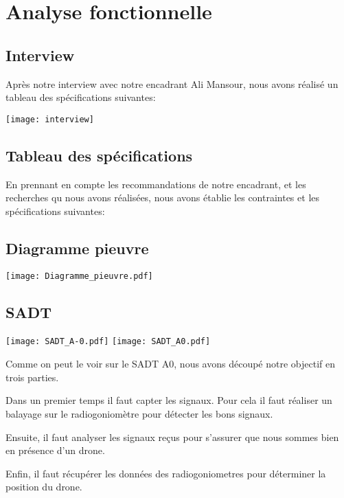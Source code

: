 \chapter{Analyse fonctionnelle}

\section{Interview}

Après notre interview avec notre encadrant Ali Mansour, nous avons réalisé un tableau des spécifications suivantes:

\texttt{[image: interview]}


\section{Tableau des spécifications}
En prennant en compte les recommandations de notre encadrant, et les recherches qu nous avons réalisées, nous avons établie les contraintes et les spécifications suivantes:





\section{Diagramme pieuvre}

\hspace{-2cm}
\texttt{[image: Diagramme\_pieuvre.pdf]}



\section{SADT}

\texttt{[image: SADT\_A-0.pdf]}
\texttt{[image: SADT\_A0.pdf]}

\parindent=15pt

Comme on peut le voir sur le SADT A0, nous avons découpé notre objectif en trois parties.

Dans un premier temps il faut capter les signaux. Pour cela il faut réaliser un balayage sur le radiogoniomètre pour détecter les bons signaux.

Ensuite, il faut analyser les signaux reçus pour s'assurer que nous sommes bien en présence d'un drone.

Enfin, il faut récupérer les données des radiogoniometres pour déterminer la position du drone.







